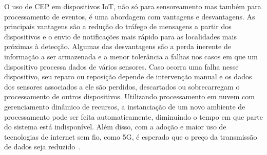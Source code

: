 O uso de CEP em dispositivos IoT, não só para sensoreamento mas também para processamento de eventos, é uma abordagem com vantagens e desvantagens. As principais vantagens são a redução do tráfego de mensagens a partir dos dispositivos e o envio de notificações mais rápido para as localidades mais próximas à detecção. Algumas das desvantagens são a perda inerente de informação a ser armazenada e a menor tolerância a falhas nos casos em que um dispositivo processa dados de vários sensores. Caso ocorra uma falha nesse dispositivo, seu reparo ou reposição depende de intervenção manual e os dados dos sensores associados a ele são perdidos, descartados ou sobrecarregam o processamento de outros dispositivos. Utilizando processamento em nuvem com gerenciamento dinâmico de recursos, a instanciação de um novo ambiente de processamento pode ser feita automaticamente, diminuindo o tempo em que parte do sistema está indisponível. Além disso, com a adoção e maior uso de tecnologias de internet sem fio, como 5G, é esperado que o preço da transmissão de dados seja reduzido~\citep{8480631,9163457,9151379}.













